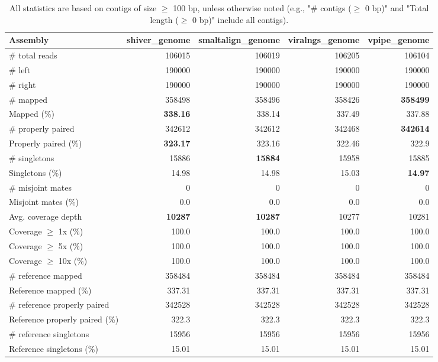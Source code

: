 \documentclass[12pt,a4paper]{article}
\begin{document}
\begin{table}[ht]
\begin{center}
\caption{All statistics are based on contigs of size $\geq$ 100 bp, unless otherwise noted (e.g., "\# contigs ($\geq$ 0 bp)" and "Total length ($\geq$ 0 bp)" include all contigs).}
\begin{tabular}{|l*{4}{|r}|}
\hline
Assembly & shiver\_genome & smaltalign\_genome & viralngs\_genome & vpipe\_genome \\ \hline
\# total reads & 106015 & 106019 & 106205 & 106104 \\ \hline
\# left & 190000 & 190000 & 190000 & 190000 \\ \hline
\# right & 190000 & 190000 & 190000 & 190000 \\ \hline
\# mapped & 358498 & 358496 & 358426 & {\bf 358499} \\ \hline
Mapped (\%) & {\bf 338.16} & 338.14 & 337.49 & 337.88 \\ \hline
\# properly paired & 342612 & 342612 & 342468 & {\bf 342614} \\ \hline
Properly paired (\%) & {\bf 323.17} & 323.16 & 322.46 & 322.9 \\ \hline
\# singletons & 15886 & {\bf 15884} & 15958 & 15885 \\ \hline
Singletons (\%) & 14.98 & 14.98 & 15.03 & {\bf 14.97} \\ \hline
\# misjoint mates & 0 & 0 & 0 & 0 \\ \hline
Misjoint mates (\%) & 0.0 & 0.0 & 0.0 & 0.0 \\ \hline
Avg. coverage depth & {\bf 10287} & {\bf 10287} & 10277 & 10281 \\ \hline
Coverage $\geq$ 1x (\%) & 100.0 & 100.0 & 100.0 & 100.0 \\ \hline
Coverage $\geq$ 5x (\%) & 100.0 & 100.0 & 100.0 & 100.0 \\ \hline
Coverage $\geq$ 10x (\%) & 100.0 & 100.0 & 100.0 & 100.0 \\ \hline
\# reference mapped & 358484 & 358484 & 358484 & 358484 \\ \hline
Reference mapped (\%) & 337.31 & 337.31 & 337.31 & 337.31 \\ \hline
\# reference properly paired & 342528 & 342528 & 342528 & 342528 \\ \hline
Reference properly paired (\%) & 322.3 & 322.3 & 322.3 & 322.3 \\ \hline
\# reference singletons & 15956 & 15956 & 15956 & 15956 \\ \hline
Reference singletons (\%) & 15.01 & 15.01 & 15.01 & 15.01 \\ \hline

\end{tabular}
\end{center}
\end{table}
\end{document}
